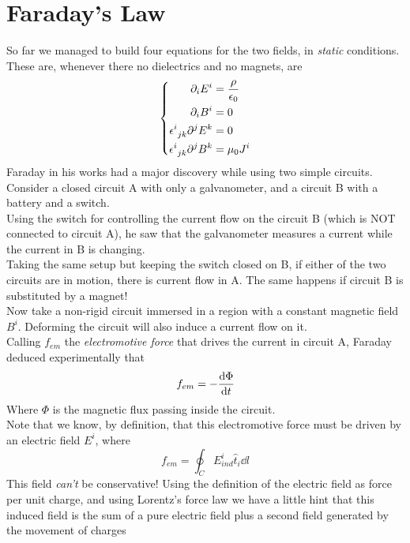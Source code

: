 \documentclass[../electromagnetism]{subfiles}
\begin{document}
\section{Faraday's Law}
So far we managed to build four equations for the two fields, in \textit{static} conditions. These are, whenever there no dielectrics and no magnets, are
\begin{equation}
	\left\{\begin{aligned}
			\partial_iE^i&=\frac{\rho}{\epsilon_0}\\
			\partial_iB^i&=0\\
			\epsilon^{i}_{\ jk}\partial^jE^k&=0\\
			\epsilon^{i}_{\ jk}\partial^jB^k&=\mu_0J^i
	\end{aligned}\right.
	\label{eq:mwstatic}
\end{equation}
Faraday in his works had a major discovery while using two simple circuits.\\
Consider a closed circuit A with only a galvanometer, and a circuit B with a battery and a switch.\\
Using the switch for controlling the current flow on the circuit B (which is NOT connected to circuit A), he saw that the galvanometer measures a current while the current in B is changing.\\
Taking the same setup but keeping the switch closed on B, if either of the two circuits are in motion, there is current flow in A. The same happens if circuit B is substituted by a magnet!\\
Now take a non-rigid circuit immersed in a region with a constant magnetic field $B^i$. Deforming the circuit will also induce a current flow on it.\\
Calling $f_{em}$ the \textit{electromotive force} that drives the current in circuit A, Faraday deduced experimentally that
\begin{equation}
	f_{em}=-\dv{\Phi}{t}
	\label{eq:faradayneumann}
\end{equation}
Where $\Phi$ is the magnetic flux passing inside the circuit.\\
Note that we know, by definition, that this electromotive force must be driven by an electric field $E^i$, where
\begin{equation}
	f_{em}=\oint_CE^i_{ind}\hat{t}_i\dd l
	\label{eq:fem}
\end{equation}
This field \emph{can't} be conservative! Using the definition of the electric field as force per unit charge, and using Lorentz's force law we have a little hint that this induced field is the sum of a pure electric field plus a second field generated by the movement of charges
\end{document}
